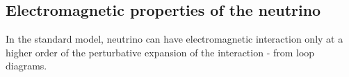 
\subsection{Electromagnetic properties of the neutrino}




In the standard model, neutrino can have electromagnetic interaction only at a higher order of the perturbative expansion of the interaction - from loop diagrams. 

